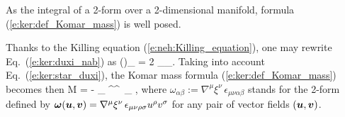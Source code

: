\begin{remark}
As the integral of a 2-form over a 2-dimensional manifold, formula
(\ref{e:ker:def_Komar_mass}) is well posed.
\end{remark}
Thanks to the Killing equation (\ref{e:neh:Killing_equation}), one may
rewrite Eq.~(\ref{e:ker:duxi_nab}) as
\be \label{e:ker:dxi_Killing}
    (\dd \uu{\xi})_{\alpha\beta} = 2 \nabla_\alpha \xi_\beta .
\ee
Taking into account Eq.~(\ref{e:ker:star_duxi}), the Komar mass formula
(\ref{e:ker:def_Komar_mass}) becomes then
\be \label{e:ker:def_Komar_mass_alt}
    M = -  \int_{\Sp}  \nabla^\mu \xi^\nu \, \epsilon_{\mu\nu\alpha\beta} ,
\ee
where $\omega_{\alpha\beta}:=\nabla^\mu \xi^\nu \, \epsilon_{\mu\nu\alpha\beta}$
stands for the 2-form defined by
$\bm{\omega}(\bm{u},\bm{v}) = \nabla^\mu \xi^\nu \, \epsilon_{\mu\nu\rho\sigma} u^\rho v^\sigma$
for any pair of vector fields $(\bm{u},\bm{v})$.

